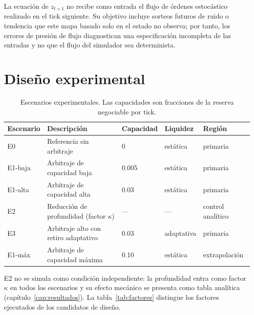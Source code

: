 La ecuación de $z_{t+1}$ no recibe como entrada el flujo de órdenes estocástico realizado en el tick siguiente. Su objetivo incluye sorteos futuros de ruido o tendencia que este mapa basado solo en el estado no observa; por tanto, los errores de presión de flujo diagnostican una especificación incompleta de las entradas y no que el flujo del simulador sea determinista.

\section{Diseño experimental}

\begin{table}[htbp]
\centering
\caption{Escenarios experimentales. Las capacidades son fracciones de la reserva negociable por tick.}
\label{tab:escenarios}
\small
\begin{tabularx}{\textwidth}{@{}l >{\raggedright\arraybackslash}X l l l@{}}
\toprule
Escenario & Descripción & Capacidad & Liquidez & Región \\
\midrule
E0 & Referencia sin arbitraje & 0 & estática & primaria \\
E1-baja & Arbitraje de capacidad baja & 0.005 & estática & primaria \\
E1-alta & Arbitraje de capacidad alta & 0.03 & estática & primaria \\
E2 & Reducción de profundidad (factor $\kappa$) & --- & --- & control analítico \\
E3 & Arbitraje alto con retiro adaptativo & 0.03 & adaptativa & primaria \\
E1-máx & Arbitraje de capacidad máxima & 0.10 & estática & extrapolación \\
\bottomrule
\end{tabularx}
\end{table}

E2 no se simula como condición independiente: la profundidad entra como factor $\kappa$ en todos los escenarios y su efecto mecánico se presenta como tabla analítica (capítulo~\ref{cap:resultados}). La tabla~\ref{tab:factores} distingue los factores ejecutados de los candidatos de diseño.

